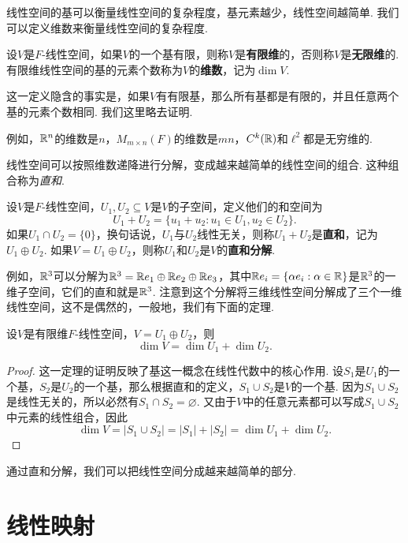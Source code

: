 线性空间的基可以衡量线性空间的复杂程度，基元素越少，线性空间越简单. 我们可以定义维数来衡量线性空间的复杂程度. 

\begin{definition}[维数]
设$V$是$F$-线性空间，如果$V$的一个基有限，则称$V$是\textbf{有限维}的，否则称$V$是\textbf{无限维}的. 有限维线性空间的基的元素个数称为$V$的\textbf{维数}，记为$\dim V$. 
\end{definition}
这一定义隐含的事实是，如果$V$有有限基，那么所有基都是有限的，并且任意两个基的元素个数相同. 我们这里略去证明. 

例如，$\mathbb{R}^n$的维数是$n$，$M_{m\times n}(F)$的维数是$mn$，$C^k(\mathbb{R})$和$\ell^2$都是无穷维的. 

线性空间可以按照维数递降进行分解，变成越来越简单的线性空间的组合. 这种组合称为\emph{直和}. 

\begin{definition}[和空间与直和]
设$V$是$F$-线性空间，$U_1,U_2\subseteq V$是$V$的子空间，定义他们的和空间为
\[
    U_1+U_2=\{u_1+u_2:u_1\in U_1,u_2\in U_2\}.
\]
如果$U_1\cap U_2=\{0\}$，换句话说，$U_1$与$U_2$线性无关，则称$U_1+U_2$是\textbf{直和}，记为$U_1\oplus U_2$. 如果$V=U_1\oplus U_2$，则称$U_1$和$U_2$是$V$的\textbf{直和分解}. 
\end{definition}

例如，$\mathbb{R}^3$可以分解为$\mathbb{R}^3=\mathbb{R} e_1\oplus \mathbb{R} e_2\oplus \mathbb{R} e_3$，其中$\mathbb{R} e_i=\{\alpha e_i:\alpha\in\mathbb{R}\}$是$\mathbb{R}^3$的一维子空间，它们的直和就是$\mathbb{R}^3$. 注意到这个分解将三维线性空间分解成了三个一维线性空间，这不是偶然的，一般地，我们有下面的定理. 

\begin{theorem}[维数定理]\label{thm:dim-thm}
设$V$是有限维$F$-线性空间，$V=U_1\oplus U_2$，则
\[
    \dim V=\dim U_1+\dim U_2.
\]
\end{theorem}
\begin{proof}
    这一定理的证明反映了基这一概念在线性代数中的核心作用. 设$S_1$是$U_1$的一个基，$S_2$是$U_2$的一个基，那么根据直和的定义，$S_1\cup S_2$是$V$的一个基. 因为$S_1\cup S_2$是线性无关的，所以必然有$S_1\cap S_2=\varnothing$. 又由于$V$中的任意元素都可以写成$S_1\cup S_2$中元素的线性组合，因此
    \[
        \dim V=|S_1\cup S_2|=|S_1|+|S_2|=\dim U_1+\dim U_2.
    \]
\end{proof}
通过直和分解，我们可以把线性空间分成越来越简单的部分. 

\section{线性映射}


